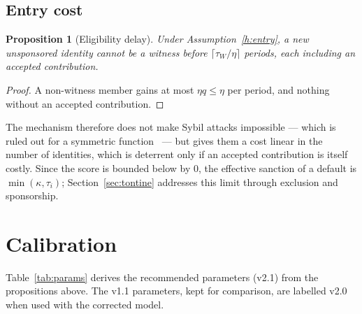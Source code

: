 \documentclass[11pt,a4paper]{article}
\theoremstyle{plain}
\newtheorem{proposition}{Proposition}
\theoremstyle{definition}
\theoremstyle{remark}
\newcommand{\1}{\mathbf{1}}
\begin{document}
\subsection{Entry cost}

\begin{proposition}[Eligibility delay]\label{prop:sybil}
Under Assumption~\ref{h:entry}, a new unsponsored identity cannot be a witness
before $\lceil\tau_W/\eta\rceil$ periods, each including an accepted
contribution.
\end{proposition}
\begin{proof}
A non-witness member gains at most $\eta q\le\eta$ per period, and nothing
without an accepted contribution.
\end{proof}

The mechanism therefore does not make Sybil attacks impossible --- which is ruled
out for a symmetric function~\cite{cheng2005} --- but gives them a cost linear in
the number of identities, which is deterrent only if an accepted contribution
is itself costly. Since the score is bounded below by 0, the effective sanction
of a default is $\min(\kappa,\tau_i)$; Section~\ref{sec:tontine} addresses this
limit through exclusion and sponsorship.

\section{Calibration}
\label{sec:calibration}

Table~\ref{tab:params} derives the recommended parameters (v2.1) from the
propositions above. The v1.1 parameters, kept for comparison, are labelled v2.0
when used with the corrected model.
\end{document}
